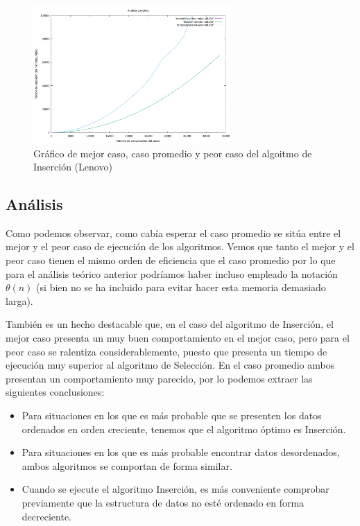 \documentclass{homework}
\begin{document}
    \begin{figure}[H]
        \centering
        \label{lenovo:insercion-mp}
           \includegraphics[width=0.67\textwidth]{../data/lenovo-insercion-mp.pdf}
        \caption{Gráfico de mejor caso, caso promedio y peor caso del algoitmo de Inserción (Lenovo)}
    \end{figure}

    \subsection{Análisis}

    Como podemos observar, como cabía esperar el caso promedio se sitúa entre el mejor y el peor caso de ejecución
    de los algoritmos. Vemos que tanto el mejor y el peor caso tienen el mismo orden de eficiencia que el caso promedio
    por lo que para el análisis teórico anterior podríamos haber incluso empleado la notación $\theta (n)$ (si bien no
    se ha incluido para evitar hacer esta memoria demasiado larga). 
    
    También es un hecho destacable que, en el caso del algoritmo de Inserción, el mejor caso presenta un muy buen
    comportamiento en el mejor caso, pero para el peor caso se ralentiza considerablemente, puesto que presenta
    un tiempo de ejecución muy superior al algoritmo de Selección. En el caso promedio ambos presentan un comportamiento
    muy parecido, por lo podemos extraer las siguientes conclusiones:
    
    \begin{itemize}
        \item Para situaciones en los que es más probable que se presenten los datos ordenados en orden creciente, tenemos que el algoritmo óptimo es Inserción.
        \item Para situaciones en los que es más probable encontrar datos desordenados, ambos algoritmos se comportan de forma similar. 
        \item Cuando se ejecute el algoritmo Inserción, es más conveniente comprobar previamente que la estructura de datos no esté ordenado en forma decreciente.
    \end{itemize}
    
\end{document}
